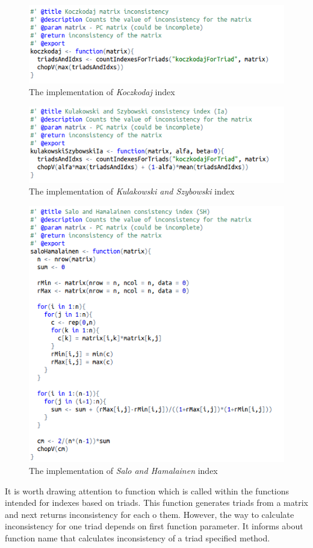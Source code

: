 \begin{figure}[h]
\centerline{\includegraphics[scale=0.75]{images/kod2.png}}
\caption{The implementation of \textit{Koczkodaj} index}
\label{fig:rstudio}
\end{figure}

\begin{figure}[h]
\centerline{\includegraphics[scale=0.75]{images/kod3.png}}
\caption{The implementation of \textit{Kulakowski and Szybowski} index}
\label{fig:rstudio}
\end{figure}

\begin{figure}[h]
\centerline{\includegraphics[scale=0.75]{images/kod4.png}}
\caption{The implementation of \textit{Salo and Hamalainen} index}
\label{fig:rstudio}
\end{figure}
It is worth drawing attention to function which is called within the functions intended for indexes based on triads. This function generates triads from a matrix and next returns inconsistency for each o them. However, the way to calculate inconsistency for one triad depends on first function parameter. It informs about function name that calculates inconsistency of a triad specified method.

